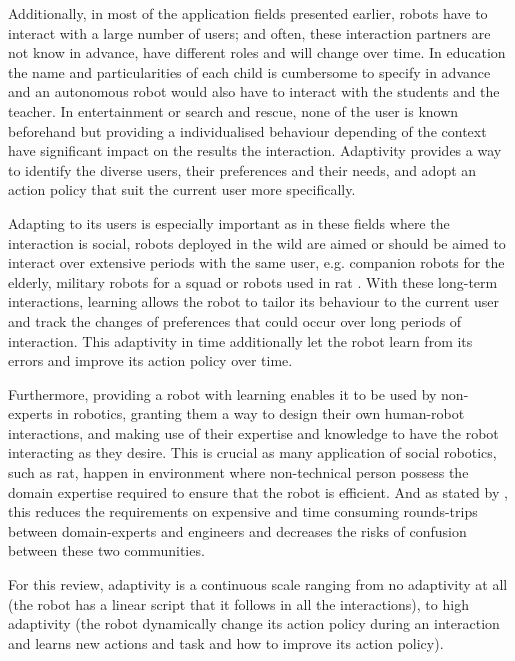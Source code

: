     Additionally, in most of the application fields presented earlier, robots have to interact with a large number of users; and often, these interaction partners are not know in advance, have different roles and will change over time. In education the name and particularities of each child is cumbersome to specify in advance and an autonomous robot would also have to interact with the students and the teacher. In entertainment or search and rescue, none of the user is known beforehand but providing a individualised behaviour depending of the context have significant impact on the results the interaction. Adaptivity provides a way to identify the diverse users, their preferences and their needs, and adopt an action policy that suit the current user more specifically. %

    Adapting to its users is especially important as in these fields where the interaction is social, robots deployed in the wild are aimed or should be aimed to interact over extensive periods with the same user, e.g. companion robots for the elderly, military robots for a squad or robots used in \gls{rat} \citep{leite2013social}. With these long-term interactions, learning allows the robot to tailor its behaviour to the current user and track the changes of preferences that could occur over long periods of interaction. This adaptivity in time additionally let the robot learn from its errors and improve its action policy over time. 

	Furthermore, providing a robot with learning enables it to be used by non-experts in robotics, granting them a way to design their own human-robot interactions, and making use of their expertise and knowledge to have the robot interacting as they desire. This is crucial as many application of social robotics, such as \gls{rat}, happen in environment where non-technical person possess the domain expertise required to ensure that the robot is efficient. And as stated by \cite{amershi2014power}, this reduces the requirements on expensive and time consuming rounds-trips between domain-experts and engineers and decreases the risks of confusion between these two communities.

    For this review, adaptivity is a continuous scale ranging from no adaptivity at all (the robot has a linear script that it follows in all the interactions), to high adaptivity (the robot dynamically change its action policy during an interaction and learns new actions and task and how to improve its action policy). 

